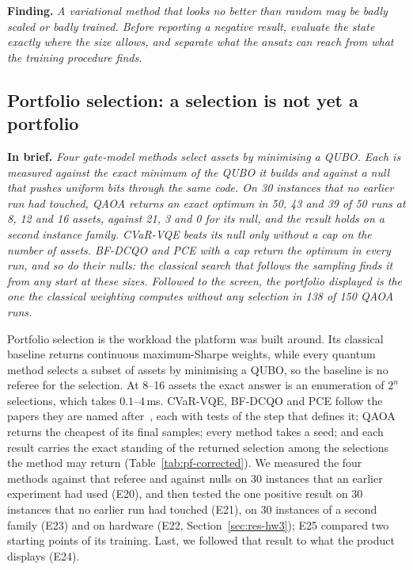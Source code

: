 \documentclass[11pt,a4paper]{article}
\newcommand{\finding}[1]{\par\smallskip\noindent\textbf{Finding.} \emph{#1}\par\smallskip}
\newcommand{\inbrief}[1]{\par\smallskip\noindent\textbf{In brief.} \emph{#1}\par\medskip}
\begin{document}
\finding{A variational method that looks no better than random may be badly
scaled or badly trained. Before reporting a negative result, evaluate the
state exactly where the size allows, and separate what the ansatz can reach
from what the training procedure finds.}

\subsection{Portfolio selection: a selection is not yet a portfolio}
\label{sec:res-portfolio2}

\inbrief{Four gate-model methods select assets by minimising a QUBO. Each
is measured against the exact minimum of the QUBO it builds and against a
null that pushes uniform bits through the same code. On 30 instances that no earlier run had
touched, QAOA returns an exact optimum in 50, 43 and 39 of 50 runs at 8, 12
and 16 assets, against 21, 3 and 0 for its null, and the result holds on a
second instance family. CVaR-VQE beats its null only without a cap on the
number of assets. BF-DCQO and PCE with a cap return the optimum in every
run, and so do their nulls: the classical search that follows the sampling
finds it from any start at these sizes. Followed to the screen, the
portfolio displayed is the one the classical weighting computes without any
selection in 138 of 150 QAOA runs.}

Portfolio selection is the workload the platform was built around. Its
classical baseline returns continuous maximum-Sharpe weights, while every
quantum method selects a subset of assets by minimising a QUBO, so the
baseline is no referee for the selection. At 8--16 assets the exact answer
is an enumeration of $2^n$ selections, which takes $0.1$--$4$\,ms.
CVaR-VQE, BF-DCQO and PCE follow the papers they are named
after~\cite{barkoutsos2020,cadavid2024,cadavid2026,sciorilli2024}, each
with tests of the step that defines it; QAOA returns the cheapest of its
final samples; every method takes a seed; and
each result carries the exact standing of the returned selection among the
selections the method may return (Table~\ref{tab:pf-corrected}). We
measured the four methods against that referee and against nulls on 30
instances that an earlier experiment had used
(E20), and then tested the one positive result on 30 instances that no
earlier run had touched (E21), on 30 instances of a second family (E23) and
on hardware (E22, Section~\ref{sec:res-hw3}); E25 compared two starting
points of its training. Last, we followed that result
to what the product displays (E24).
\end{document}

